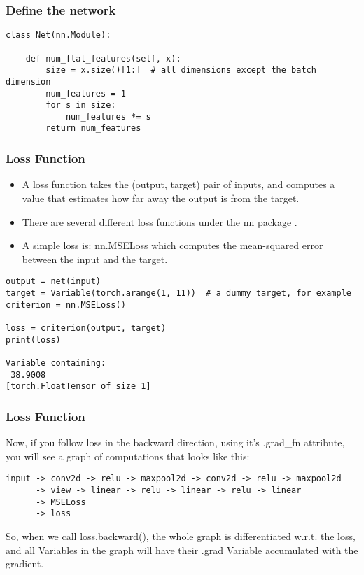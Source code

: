 \begin{frame}[fragile] \frametitle{Define the network}
\begin{lstlisting}
class Net(nn.Module):

    def num_flat_features(self, x):
        size = x.size()[1:]  # all dimensions except the batch dimension
        num_features = 1
        for s in size:
            num_features *= s
        return num_features
\end{lstlisting}
\end{frame}

\begin{frame}[fragile] \frametitle{Loss Function}
\begin{itemize}
\item A loss function takes the (output, target) pair of inputs, and computes a value that estimates how far away the output is from the target.
\item There are several different loss functions under the nn package . 
\item A simple loss is: nn.MSELoss which computes the mean-squared error between the input and the target.
\end{itemize}
\begin{lstlisting}
output = net(input)
target = Variable(torch.arange(1, 11))  # a dummy target, for example
criterion = nn.MSELoss()

loss = criterion(output, target)
print(loss)

Variable containing:
 38.9008
[torch.FloatTensor of size 1]
\end{lstlisting}

\end{frame}

\begin{frame}[fragile] \frametitle{Loss Function}
Now, if you follow loss in the backward direction, using it's .grad\_fn attribute, you will see a graph of computations that looks like this:
\begin{lstlisting}
input -> conv2d -> relu -> maxpool2d -> conv2d -> relu -> maxpool2d
      -> view -> linear -> relu -> linear -> relu -> linear
      -> MSELoss
      -> loss
\end{lstlisting}
So, when we call loss.backward(), the whole graph is differentiated w.r.t. the loss, and all Variables in the graph will have their .grad Variable accumulated with the gradient.
\end{frame}

